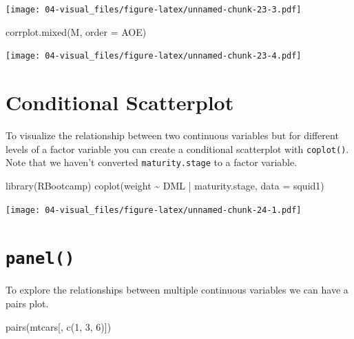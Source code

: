 \documentclass[
]{book}
\newenvironment{Shaded}{\begin{snugshade}}{\end{snugshade}}
\newcommand{\AttributeTok}[1]{\textcolor[rgb]{0.77,0.63,0.00}{#1}}
\newcommand{\DecValTok}[1]{\textcolor[rgb]{0.00,0.00,0.81}{#1}}
\newcommand{\FunctionTok}[1]{\textcolor[rgb]{0.00,0.00,0.00}{#1}}
\newcommand{\NormalTok}[1]{#1}
\newcommand{\SpecialCharTok}[1]{\textcolor[rgb]{0.00,0.00,0.00}{#1}}
\newcommand{\StringTok}[1]{\textcolor[rgb]{0.31,0.60,0.02}{#1}}
\begin{document}
\texttt{[image: 04-visual\_files/figure-latex/unnamed-chunk-23-3.pdf]}

\begin{Shaded}
\begin{Highlighting}[]
\FunctionTok{corrplot.mixed}\NormalTok{(M, }\AttributeTok{order =} \StringTok{\textquotesingle{}AOE\textquotesingle{}}\NormalTok{)}
\end{Highlighting}
\end{Shaded}

\texttt{[image: 04-visual\_files/figure-latex/unnamed-chunk-23-4.pdf]}

\hypertarget{conditional-scatterplot}{%
\section{Conditional Scatterplot}\label{conditional-scatterplot}}

To visualize the relationship between two continuous variables but for different levels of a factor variable you can create a conditional scatterplot with \texttt{coplot()}. Note that we haven't converted \texttt{maturity.stage} to a factor variable.

\begin{Shaded}
\begin{Highlighting}[]
\FunctionTok{library}\NormalTok{(RBootcamp)}
\FunctionTok{coplot}\NormalTok{(weight }\SpecialCharTok{\textasciitilde{}}\NormalTok{ DML }\SpecialCharTok{|}\NormalTok{ maturity.stage, }\AttributeTok{data =}\NormalTok{ squid1)}
\end{Highlighting}
\end{Shaded}

\texttt{[image: 04-visual\_files/figure-latex/unnamed-chunk-24-1.pdf]}

\hypertarget{panel}{%
\section{\texorpdfstring{\texttt{panel()}}{panel()}}\label{panel}}

To explore the relationships between multiple continuous variables we can have a pairs plot.

\begin{Shaded}
\begin{Highlighting}[]
\FunctionTok{pairs}\NormalTok{(mtcars[, }\FunctionTok{c}\NormalTok{(}\DecValTok{1}\NormalTok{, }\DecValTok{3}\NormalTok{, }\DecValTok{6}\NormalTok{)])}
\end{Highlighting}
\end{Shaded}
\end{document}
